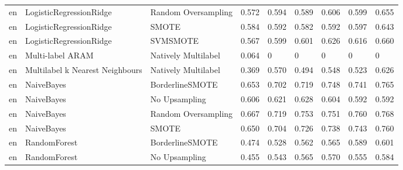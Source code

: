 \begin{tabular}{lllllllll}
      en &         LogisticRegressionRidge &           Random Oversampling & 0.572 &                     0.594 &                 0.589 &                  0.606 &                                   0.599 &     0.655 \\
      en &         LogisticRegressionRidge &                         SMOTE & 0.584 &                     0.592 &                 0.582 &                  0.592 &                                   0.597 &     0.643 \\
      en &         LogisticRegressionRidge &                      SVMSMOTE & 0.567 &                     0.599 &                 0.601 &                  0.626 &                                   0.616 &     0.660 \\
      en &                Multi-label ARAM &           Natively Multilabel & 0.064 &                         0 &                     0 &                      0 &                                       0 &         0 \\
      en & Multilabel k Nearest Neighbours &           Natively Multilabel & 0.369 &                     0.570 &                 0.494 &                  0.548 &                                   0.523 &     0.626 \\
      en &                      NaiveBayes &               BorderlineSMOTE & 0.653 &                     0.702 &                 0.719 &                  0.748 &                                   0.741 &     0.765 \\
      en &                      NaiveBayes &                 No Upsampling & 0.606 &                     0.621 &                 0.628 &                  0.604 &                                   0.592 &     0.592 \\
      en &                      NaiveBayes &           Random Oversampling & 0.667 &                     0.719 &                 0.753 &                  0.751 &                                   0.760 &     0.768 \\
      en &                      NaiveBayes &                         SMOTE & 0.650 &                     0.704 &                 0.726 &                  0.738 &                                   0.743 &     0.760 \\
      en &                    RandomForest &               BorderlineSMOTE & 0.474 &                     0.528 &                 0.562 &                  0.565 &                                   0.589 &     0.601 \\
      en &                    RandomForest &                 No Upsampling & 0.455 &                     0.543 &                 0.565 &                  0.570 &                                   0.555 &     0.584 \\

\end{tabular}
